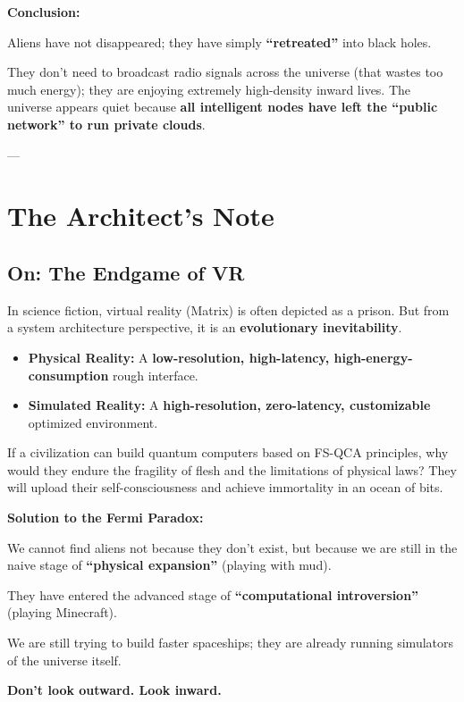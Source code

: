 \documentclass[11pt,a4paper,twoside]{book}
\begin{document}
\textbf{Conclusion:}

Aliens have not disappeared; they have simply \textbf{``retreated''} into black holes.

They don't need to broadcast radio signals across the universe (that wastes too much energy); they are enjoying extremely high-density inward lives. The universe appears quiet because \textbf{all intelligent nodes have left the ``public network'' to run private clouds}.

---

\section{The Architect's Note}

\subsection{On: The Endgame of VR}

In science fiction, virtual reality (Matrix) is often depicted as a prison. But from a system architecture perspective, it is an \textbf{evolutionary inevitability}.

\begin{itemize}
\item \textbf{Physical Reality:} A \textbf{low-resolution, high-latency, high-energy-consumption} rough interface.

\item \textbf{Simulated Reality:} A \textbf{high-resolution, zero-latency, customizable} optimized environment.
\end{itemize}

If a civilization can build quantum computers based on FS-QCA principles, why would they endure the fragility of flesh and the limitations of physical laws? They will upload their self-consciousness and achieve immortality in an ocean of bits.

\textbf{Solution to the Fermi Paradox:}

We cannot find aliens not because they don't exist, but because we are still in the naive stage of \textbf{``physical expansion''} (playing with mud).

They have entered the advanced stage of \textbf{``computational introversion''} (playing Minecraft).

We are still trying to build faster spaceships; they are already running simulators of the universe itself.

\textbf{Don't look outward. Look inward.}
\end{document}
